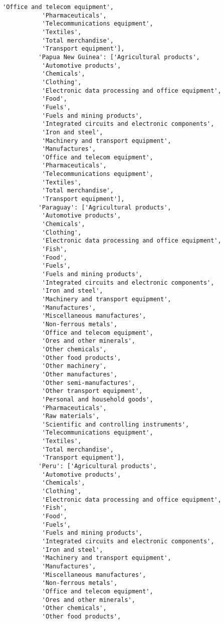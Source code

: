 \documentclass[11pt]{article}
\begin{document}
\begin{Verbatim}[commandchars=\\\{\}]
           'Office and telecom equipment',
           'Pharmaceuticals',
           'Telecommunications equipment',
           'Textiles',
           'Total merchandise',
           'Transport equipment'],
          'Papua New Guinea': ['Agricultural products',
           'Automotive products',
           'Chemicals',
           'Clothing',
           'Electronic data processing and office equipment',
           'Food',
           'Fuels',
           'Fuels and mining products',
           'Integrated circuits and electronic components',
           'Iron and steel',
           'Machinery and transport equipment',
           'Manufactures',
           'Office and telecom equipment',
           'Pharmaceuticals',
           'Telecommunications equipment',
           'Textiles',
           'Total merchandise',
           'Transport equipment'],
          'Paraguay': ['Agricultural products',
           'Automotive products',
           'Chemicals',
           'Clothing',
           'Electronic data processing and office equipment',
           'Fish',
           'Food',
           'Fuels',
           'Fuels and mining products',
           'Integrated circuits and electronic components',
           'Iron and steel',
           'Machinery and transport equipment',
           'Manufactures',
           'Miscellaneous manufactures',
           'Non-ferrous metals',
           'Office and telecom equipment',
           'Ores and other minerals',
           'Other chemicals',
           'Other food products',
           'Other machinery',
           'Other manufactures',
           'Other semi-manufactures',
           'Other transport equipment',
           'Personal and household goods',
           'Pharmaceuticals',
           'Raw materials',
           'Scientific and controlling instruments',
           'Telecommunications equipment',
           'Textiles',
           'Total merchandise',
           'Transport equipment'],
          'Peru': ['Agricultural products',
           'Automotive products',
           'Chemicals',
           'Clothing',
           'Electronic data processing and office equipment',
           'Fish',
           'Food',
           'Fuels',
           'Fuels and mining products',
           'Integrated circuits and electronic components',
           'Iron and steel',
           'Machinery and transport equipment',
           'Manufactures',
           'Miscellaneous manufactures',
           'Non-ferrous metals',
           'Office and telecom equipment',
           'Ores and other minerals',
           'Other chemicals',
           'Other food products',

\end{Verbatim}
\end{document}
